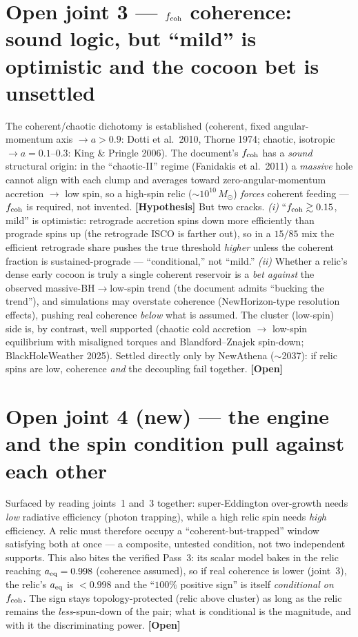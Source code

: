 \documentclass[11pt]{article}
\newcommand{\Hyp}{\textbf{\textcolor{blue!55!black}{[Hypothesis]}}}
\newcommand{\Open}{\textbf{\textcolor{gray!10!black}{[Open]}}}
\newcommand{\msun}{M_\odot}
\begin{document}
\section{Open joint 3 --- $f_{\rm coh}$ coherence: sound logic, but ``mild'' is optimistic and the cocoon bet is unsettled}
The coherent/chaotic dichotomy is established (coherent, fixed angular-momentum axis $\to a>0.9$: Dotti et al.\ 2010, Thorne 1974; chaotic, isotropic $\to a=0.1$--$0.3$: King \& Pringle 2006). The document's $f_{\rm coh}$ has a \emph{sound} structural origin: in the ``chaotic-II'' regime (Fanidakis et al.\ 2011) a \emph{massive} hole cannot align with each clump and averages toward zero-angular-momentum accretion $\to$ low spin, so a high-spin relic ($\sim10^{10}\,\msun$) \emph{forces} coherent feeding --- $f_{\rm coh}$ is required, not invented. \Hyp
But two cracks. \emph{(i)} ``$f_{\rm coh}\gtrsim0.15$, mild'' is optimistic: retrograde accretion spins down more efficiently than prograde spins up (the retrograde ISCO is farther out), so in a $15/85$ mix the efficient retrograde share pushes the true threshold \emph{higher} unless the coherent fraction is sustained-prograde --- ``conditional,'' not ``mild.'' \emph{(ii)} Whether a relic's dense early cocoon is truly a single coherent reservoir is a \emph{bet against} the observed massive-BH$\to$low-spin trend (the document admits ``bucking the trend''), and simulations may overstate coherence (NewHorizon-type resolution effects), pushing real coherence \emph{below} what is assumed. The cluster (low-spin) side is, by contrast, well supported (chaotic cold accretion $\to$ low-spin equilibrium with misaligned torques and Blandford--Znajek spin-down; BlackHoleWeather 2025). Settled directly only by NewAthena ($\sim$2037): if relic spins are low, coherence \emph{and} the decoupling fail together. \Open

\section{Open joint 4 (new) --- the engine and the spin condition pull against each other}
Surfaced by reading joints~1 and~3 together: super-Eddington over-growth needs \emph{low} radiative efficiency (photon trapping), while a high relic spin needs \emph{high} efficiency. A relic must therefore occupy a ``coherent-but-trapped'' window satisfying both at once --- a composite, untested condition, not two independent supports. This also bites the verified Pass~3: its scalar model bakes in the relic reaching $a_{\rm eq}=0.998$ (coherence assumed), so if real coherence is lower (joint~3), the relic's $a_{\rm eq}$ is $<0.998$ and the ``$100\%$ positive sign'' is itself \emph{conditional on} $f_{\rm coh}$. The sign stays topology-protected (relic above cluster) as long as the relic remains the \emph{less}-spun-down of the pair; what is conditional is the magnitude, and with it the discriminating power. \Open
\end{document}
